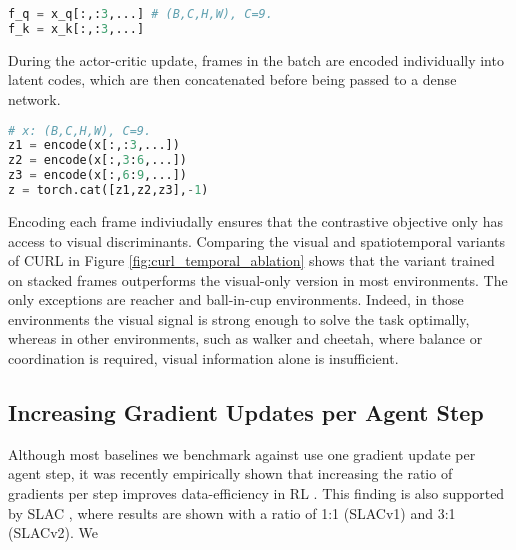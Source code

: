 \documentclass{article}
\begin{document}
\begin{lstlisting}[language=python]
f_q = x_q[:,:3,...] # (B,C,H,W), C=9.
f_k = x_k[:,:3,...]
\end{lstlisting}


During the actor-critic update, frames in the batch are encoded individually into latent codes, which are then concatenated before being passed to a dense network.

\begin{lstlisting}[language=python]
# x: (B,C,H,W), C=9.
z1 = encode(x[:,:3,...])
z2 = encode(x[:,3:6,...])
z3 = encode(x[:,6:9,...])
z = torch.cat([z1,z2,z3],-1)
\end{lstlisting}


Encoding each frame indiviudally ensures that the contrastive objective only has access to visual discriminants. Comparing the visual and spatiotemporal variants of CURL in Figure \ref{fig:curl_temporal_ablation} shows that the variant trained on stacked frames outperforms the visual-only version in most environments. The only exceptions are reacher and ball-in-cup environments. Indeed, in those environments the visual signal is strong enough to solve the task optimally, whereas in other environments, such as walker and cheetah, where balance or coordination is required, visual information alone is insufficient.

\subsection{Increasing Gradient Updates per Agent Step}

Although most baselines we benchmark against use one gradient update per agent step, it was recently empirically shown that increasing the ratio of gradients per step improves data-efficiency in RL \cite{kielak2020rainbow}. This finding is also supported by SLAC \cite{lee2019stochastic}, where results are shown with a ratio of 1:1 (SLACv1) and 3:1 (SLACv2). We 
\end{document}
